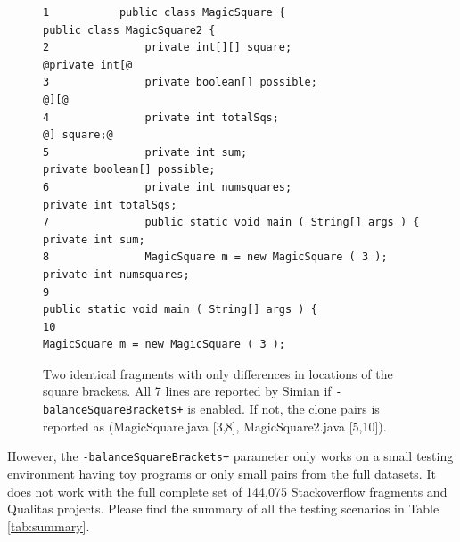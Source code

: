 \documentclass{IEEEtran}
\begin{document}
\noindent\begin{figure}[H]
	\scriptsize
	\begin{lstlisting}[frame=single,style=base]
1           public class MagicSquare {                             public class MagicSquare2 {
2               private int[][] square;                                @private int[@
3               private boolean[] possible;                                        @][@
4               private int totalSqs;                                              @] square;@
5               private int sum;                                       private boolean[] possible;
6               private int numsquares;                                private int totalSqs;
7               public static void main ( String[] args ) {            private int sum;
8               MagicSquare m = new MagicSquare ( 3 );                 private int numsquares;
9                                                                      public static void main ( String[] args ) {
10                                                                     MagicSquare m = new MagicSquare ( 3 );
	\end{lstlisting}
	\caption{Two identical fragments with only differences in locations of the square brackets. All 7 lines are reported by Simian if \small\texttt{-balanceSquareBrackets+} \normalsize is enabled. If not, the clone pairs is reported as \newline (MagicSquare.java [3,8], MagicSquare2.java [5,10]).} 
	\label{fig:two_frags}
\end{figure}

However, the \texttt{-balanceSquareBrackets+} parameter only works on a small testing environment having toy programs or only small pairs from the full datasets. It does not work with the full complete set of 144,075 Stackoverflow fragments and Qualitas projects. Please find the summary of all the testing scenarios in Table \ref{tab:summary}. %
\end{document}
